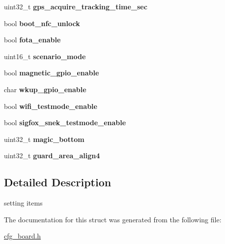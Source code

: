 \begin{DoxyCompactItemize}
uint32\+\_\+t {\bfseries gps\+\_\+acquire\+\_\+tracking\+\_\+time\+\_\+sec}
\item 
\mbox{\label{structmodule__parameter__t_a807cbdd16c853103700adda0576cd2a4}} 
bool {\bfseries boot\+\_\+nfc\+\_\+unlock}
\item 
\mbox{\label{structmodule__parameter__t_a2c0dde3e683732628455befd653f5ecc}} 
bool {\bfseries fota\+\_\+enable}
\item 
\mbox{\label{structmodule__parameter__t_a2cd898632530a0b1cc3a519b5351a1d9}} 
uint16\+\_\+t {\bfseries scenario\+\_\+mode}
\item 
\mbox{\label{structmodule__parameter__t_aff8bbb21d00ad034bff0dbd572bfcfa7}} 
bool {\bfseries magnetic\+\_\+gpio\+\_\+enable}
\item 
\mbox{\label{structmodule__parameter__t_ab744fa27cd1701bcac46e52cdafc294c}} 
char {\bfseries wkup\+\_\+gpio\+\_\+enable}
\item 
\mbox{\label{structmodule__parameter__t_a7dc14b1f06a6051bda513ba948cce75d}} 
bool {\bfseries wifi\+\_\+testmode\+\_\+enable}
\item 
\mbox{\label{structmodule__parameter__t_a87b953773868dde8cfce94955e57ec50}} 
bool {\bfseries sigfox\+\_\+snek\+\_\+testmode\+\_\+enable}
\item 
\mbox{\label{structmodule__parameter__t_a4f60245eb394f068009d24205f49474d}} 
uint32\+\_\+t {\bfseries magic\+\_\+bottom}
\item 
\mbox{\label{structmodule__parameter__t_a6d6f5533c60db62925e4ea10629971d3}} 
uint32\+\_\+t {\bfseries guard\+\_\+area\+\_\+align4}
\end{DoxyCompactItemize}


\subsection{Detailed Description}
setting items 

The documentation for this struct was generated from the following file\+:\begin{DoxyCompactItemize}
\item 
\hyperlink{cfg__board_8h}{cfg\+\_\+board.\+h}\end{DoxyCompactItemize}
